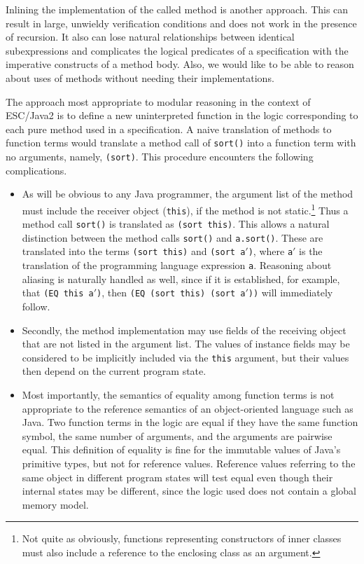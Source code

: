 \documentclass{sig-alternate2}
\begin{document}
Inlining the implementation of the called method is another approach.  This can result in large,
 unwieldy verification conditions and does not work in the presence of recursion.  It also can
lose natural relationships between identical subexpressions and complicates the logical
predicates of a specification with the imperative constructs of a method body.  Also, we would like
to be able to reason about uses of methods without needing their implementations.

The approach most appropriate to modular reasoning in the context of ESC/Java2 is to
define a new uninterpreted function in the logic corresponding to each pure method used
in a specification.  A naive translation of methods to
function terms would translate a method call of \texttt{sort()} into a function term with no
arguments, namely, \texttt{(sort)}.  This procedure encounters the following complications.
\setlength{\partopsep}{0in}\setlength{\parskip}{0in}\setlength{\itemsep}{0in}\setlength{\topsep}{0in}
\begin{itemize}
\setlength{\partopsep}{0in}\setlength{\parskip}{0in}\setlength{\itemsep}{0in}\setlength{\topsep}{0in}
\item
As will be obvious to any Java programmer, the argument list of the method 
must include the receiver object (\texttt{this}), if the method is not static.\footnote{Not quite as obviously,
functions representing constructors of inner classes must also include a reference to the
enclosing class as an argument.}  Thus a method call 
\texttt{sort()} is translated as \texttt{(sort this)}.
This allows a natural distinction between the method calls \texttt{sort()} and \texttt{a.sort()}.  
These are translated into the terms \texttt{(sort this)} and \texttt{(sort a$'$)}, 
where \texttt{a$'$} is the translation of
the programming language expression \texttt{a}.  
Reasoning about aliasing is naturally handled as well, since if it is established, for example, that
\texttt{(EQ this a$'$)}, then \texttt{(EQ (sort this) (sort a$'$))} will immediately follow.

\item
Secondly, the method implementation may use fields
of the receiving object that are not listed in the argument list.  The values of instance fields
may be considered to be implicitly included via the \texttt{this} argument, but their values then
depend on the current program state.  

\item
Most importantly, the semantics of equality among function terms is not appropriate to the
reference semantics of an object-oriented language such as Java.  Two function terms in the
logic are equal if they have the same function symbol, the same number of arguments, and the
arguments are pairwise equal.  This definition of equality is fine for the immutable
values of Java's primitive types, but not for reference values.  Reference values 
referring to the
same object in different program
states will test equal even though their internal states may be different, since
the logic used does not contain a global memory model.

\end{itemize}
\end{document}
